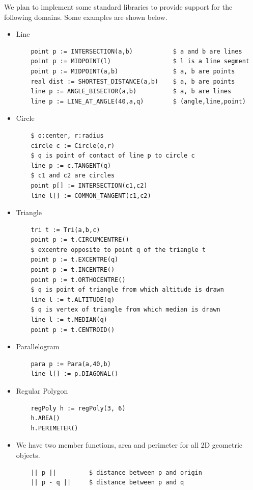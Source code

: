 \documentclass[12pt]{article}
\begin{document}
We plan to implement some standard libraries to provide support for the following domains. Some examples are shown below.
\begin{itemize}
    \item Line 
\begin{verbatim}
    point p := INTERSECTION(a,b)           $ a and b are lines
    point p := MIDPOINT(l)                 $ l is a line segment
    point p := MIDPOINT(a,b)               $ a, b are points
    real dist := SHORTEST_DISTANCE(a,b)    $ a, b are points
    line p := ANGLE_BISECTOR(a,b)          $ a, b are lines
    line p := LINE_AT_ANGLE(40,a,q)        $ (angle,line,point)
\end{verbatim}
\item Circle
\begin{verbatim}
    $ o:center, r:radius
    circle c := Circle(o,r)                 
    $ q is point of contact of line p to circle c
    line p := c.TANGENT(q)  
    $ c1 and c2 are circles               
    point p[] := INTERSECTION(c1,c2)   
    line l[] := COMMON_TANGENT(c1,c2)
\end{verbatim}

\item Triangle
\begin{verbatim}
    tri t := Tri(a,b,c)
    point p := t.CIRCUMCENTRE()
    $ excentre opposite to point q of the triangle t
    point p := t.EXCENTRE(q) 
    point p := t.INCENTRE()    
    point p := t.ORTHOCENTRE() 
    $ q is point of triangle from which altitude is drawn  
    line l := t.ALTITUDE(q)
    $ q is vertex of triangle from which median is drawn  
    line l := t.MEDIAN(q)
    point p := t.CENTROID()            
\end{verbatim}

\item Parallelogram
\begin{verbatim}
    para p := Para(a,40,b)
    line l[] := p.DIAGONAL()
\end{verbatim}
\item Regular Polygon
\begin{verbatim}
    regPoly h := regPoly(3, 6)
    h.AREA()
    h.PERIMETER()
\end{verbatim}
\item We have two member functions, area and perimeter for all 2D geometric objects.
\begin{verbatim}
    || p ||         $ distance between p and origin
    || p - q ||     $ distance between p and q 
\end{verbatim}
\end{itemize}
\end{document}

